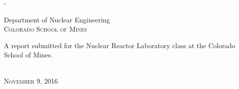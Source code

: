 \begin{titlingpage}
\begin{SingleSpace}
\begin{adjustwidth*}{\unitlength}{-\unitlength}
\begin{center}
\vspace{6mm}
{\large Department of Nuclear Engineering\\
\textsc{Colorado School of Mines}}\\
\vspace{11mm}
\begin{minipage}{10cm}
A report submitted for the Nuclear Reactor Laboratory class at the Colorado School of Mines.
\end{minipage}\\
\vspace{9mm}
{\large\textsc{November 9, 2016}}
\vspace{12mm}
\end{center}
\end{adjustwidth*}
\end{SingleSpace}
\end{titlingpage}
